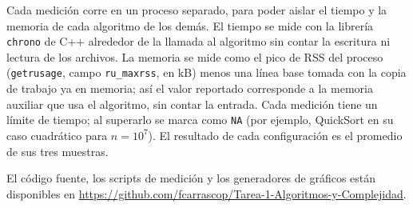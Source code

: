 Cada medición corre en un proceso separado, para poder aislar el tiempo y la memoria de cada algoritmo de los demás. El tiempo se mide con la librería \texttt{chrono} de C++ alrededor de la llamada al algoritmo sin contar la escritura ni lectura de los archivos. La memoria se mide como el pico de RSS del proceso (\texttt{getrusage}, campo \texttt{ru\_maxrss}, en kB) menos una línea base tomada con la copia de trabajo ya en memoria; así el valor reportado corresponde a la memoria auxiliar que usa el algoritmo, sin contar la entrada.
Cada medición tiene un límite de tiempo; al superarlo se marca como \texttt{NA} (por ejemplo, QuickSort en su caso cuadrático para $n = 10^7$). El resultado de cada configuración es el promedio de sus tres muestras.

El código fuente, los scripts de medición y los generadores de gráficos están disponibles en \url{https://github.com/fcarrascop/Tarea-1-Algoritmos-y-Complejidad}.
